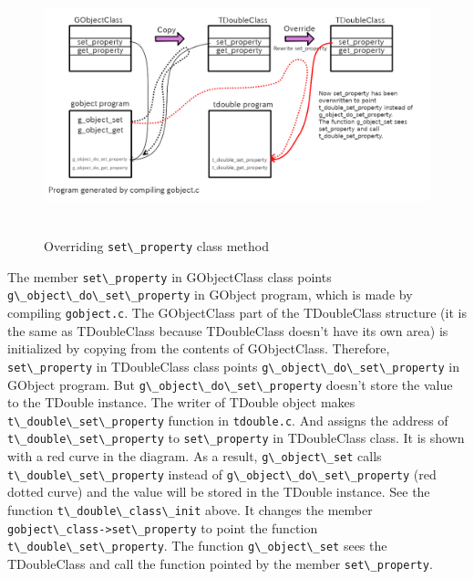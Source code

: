 \begin{figure}
\centering
\includegraphics[width=15cm,height=7.5cm]{../image/class_property1.png}
\caption{Overriding \passthrough{\lstinline!set\_property!} class
method}
\end{figure}

The member \passthrough{\lstinline!set\_property!} in GObjectClass class
points \passthrough{\lstinline!g\_object\_do\_set\_property!} in GObject
program, which is made by compiling \passthrough{\lstinline!gobject.c!}.
The GObjectClass part of the TDoubleClass structure (it is the same as
TDoubleClass because TDoubleClass doesn't have its own area) is
initialized by copying from the contents of GObjectClass. Therefore,
\passthrough{\lstinline!set\_property!} in TDoubleClass class points
\passthrough{\lstinline!g\_object\_do\_set\_property!} in GObject
program. But \passthrough{\lstinline!g\_object\_do\_set\_property!}
doesn't store the value to the TDouble instance. The writer of TDouble
object makes \passthrough{\lstinline!t\_double\_set\_property!} function
in \passthrough{\lstinline!tdouble.c!}. And assigns the address of
\passthrough{\lstinline!t\_double\_set\_property!} to
\passthrough{\lstinline!set\_property!} in TDoubleClass class. It is
shown with a red curve in the diagram. As a result,
\passthrough{\lstinline!g\_object\_set!} calls
\passthrough{\lstinline!t\_double\_set\_property!} instead of
\passthrough{\lstinline!g\_object\_do\_set\_property!} (red dotted
curve) and the value will be stored in the TDouble instance. See the
function \passthrough{\lstinline!t\_double\_class\_init!} above. It
changes the member
\passthrough{\lstinline!gobject\_class->set\_property!} to point the
function \passthrough{\lstinline!t\_double\_set\_property!}. The
function \passthrough{\lstinline!g\_object\_set!} sees the TDoubleClass
and call the function pointed by the member
\passthrough{\lstinline!set\_property!}.

